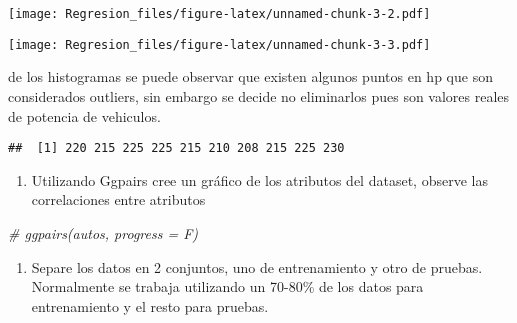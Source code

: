 \documentclass[]{article}
\newenvironment{Shaded}{\begin{snugshade}}{\end{snugshade}}
\newcommand{\CommentTok}[1]{\textcolor[rgb]{0.56,0.35,0.01}{\textit{#1}}}
\newcommand{\DataTypeTok}[1]{\textcolor[rgb]{0.13,0.29,0.53}{#1}}
\newcommand{\KeywordTok}[1]{\textcolor[rgb]{0.13,0.29,0.53}{\textbf{#1}}}
\newcommand{\NormalTok}[1]{#1}
\newcommand{\OperatorTok}[1]{\textcolor[rgb]{0.81,0.36,0.00}{\textbf{#1}}}
\newcommand{\StringTok}[1]{\textcolor[rgb]{0.31,0.60,0.02}{#1}}
\providecommand{\tightlist}{%
  \setlength{\itemsep}{0pt}\setlength{\parskip}{0pt}}
\begin{document}
\texttt{[image: Regresion\_files/figure-latex/unnamed-chunk-3-2.pdf]}

\begin{Shaded}
\end{Shaded}

\texttt{[image: Regresion\_files/figure-latex/unnamed-chunk-3-3.pdf]}

de los histogramas se puede observar que existen algunos puntos en hp
que son considerados outliers, sin embargo se decide no eliminarlos pues
son valores reales de potencia de vehiculos.

\begin{Shaded}
\end{Shaded}

\begin{verbatim}
##  [1] 220 215 225 225 215 210 208 215 225 230
\end{verbatim}

\begin{enumerate}
\def\labelenumi{\arabic{enumi}.}
\setcounter{enumi}{1}
\tightlist
\item
  Utilizando Ggpairs cree un gráfico de los atributos del dataset,
  observe las correlaciones entre atributos
\end{enumerate}

\begin{Shaded}
\begin{Highlighting}[]
\CommentTok{# ggpairs(autos, progress = F)}
\end{Highlighting}
\end{Shaded}

\begin{enumerate}
\def\labelenumi{\arabic{enumi}.}
\setcounter{enumi}{2}
\tightlist
\item
  Separe los datos en 2 conjuntos, uno de entrenamiento y otro de
  pruebas. Normalmente se trabaja utilizando un 70-80\% de los datos
  para entrenamiento y el resto para pruebas.
\end{enumerate}
\end{document}
